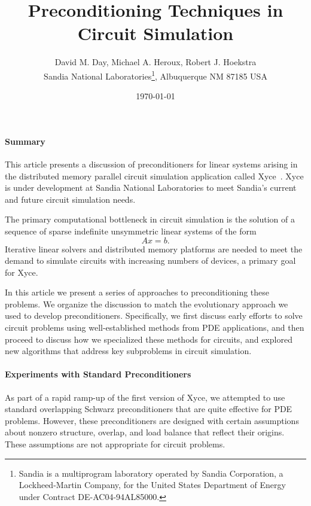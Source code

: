 \documentclass[10pt,fleqn]{article}
\begin{document}
%
%
\title{Preconditioning Techniques in Circuit Simulation}

\author{David M. Day, Michael A. Heroux, Robert J. Hoekstra \\
Sandia National Laboratories\footnote{
Sandia is a multiprogram laboratory operated by Sandia Corporation, a
Lockheed-Martin Company, for the United States Department of Energy
under Contract DE-AC04-94AL85000.}, Albuquerque NM 87185 USA}

\date{\today}

\maketitle

\paragraph{Summary}
This article presents a discussion of
preconditioners for linear systems arising in the 
distributed memory parallel circuit simulation application called
Xyce~\cite{Xyce-home-page}. Xyce is under development at Sandia National Laboratories to
meet Sandia's current and future circuit simulation needs.

The primary computational bottleneck in circuit simulation is the
solution of a sequence of sparse indefinite unsymmetric linear systems
of the form 
\begin{equation}
Ax = b.
\label{Equation1}
\end{equation}
Iterative linear solvers and distributed memory platforms
are needed to meet the demand to simulate circuits with increasing
numbers of devices, a primary goal for Xyce.  

In this article we present a series of approaches to
preconditioning these problems.  We organize the discussion to match
the evolutionary approach we used to develop preconditioners.
Specifically, we first discuss early efforts to solve circuit problems
using well-established methods from PDE applications, and then proceed
to discuss how we specialized these methods for circuits, and explored
new algorithms that address key subproblems in circuit simulation.


\paragraph{Experiments with Standard Preconditioners}
As part of a rapid ramp-up of the first version of Xyce, 
we attempted to use standard overlapping Schwarz preconditioners that are quite effective
for PDE problems.  However, these preconditioners are designed with certain
assumptions about nonzero structure,
overlap, and load balance that reflect their origins.  These assumptions are not appropriate
for circuit problems.
\end{document}
